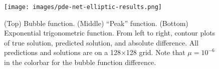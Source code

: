 \documentclass[preprint,12pt]{elsarticle}
\begin{document}
\begin{table}[ht!]
\centering
\bgroup
\def\arraystretch{1.2}%
\egroup
\caption{Finite difference errors for selected elliptic problems for comparison.}
\label{tab:fd-results}
\end{table}

\begin{figure}
    \centering
    \texttt{[image: images/pde-net-elliptic-results.png]}
    \caption{(Top) Bubble function. (Middle) ``Peak'' function. (Bottom) Exponential trigonometric function. From left to right, contour plots of true solution, predicted solution, and absolute difference. All predictions and solutions are on a 128$\times$128 grid. Note that $\mu = 10^{-6}$ in the colorbar for the bubble function difference.}
    \label{fig:elliptic-results}
\end{figure}
\end{document}

